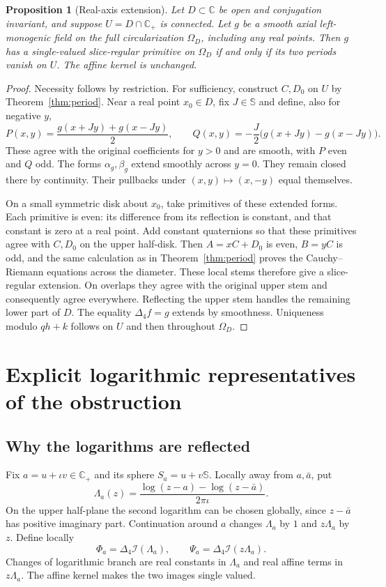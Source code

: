 \documentclass[11pt,a4paper]{article}
\numberwithin{equation}{section}
\newtheorem{proposition}[theorem]{Proposition}
\theoremstyle{definition}
\theoremstyle{remark}
\newcommand{\C}{\mathbb C}
\newcommand{\SSS}{\mathbb S}
\newcommand{\lap}{\Delta_4}
\newcommand{\lift}{\mathcal I}
\begin{document}
\begin{proposition}[Real-axis extension]\label{prop:axis}
Let $D\subset\C$ be open and conjugation invariant, and suppose
$U=D\cap\C_+$ is connected. Let $g$ be a smooth axial left-monogenic
field on the full circularization $\Omega_D$, including any real points.
Then $g$ has a single-valued slice-regular primitive on $\Omega_D$ if and
only if its two periods vanish on $U$. The affine kernel is unchanged.
\end{proposition}
\begin{proof}
Necessity follows by restriction. For sufficiency, construct $C,D_0$ on
$U$ by Theorem~\ref{thm:period}. Near a real point $x_0\in D$, fix
$J\in\SSS$ and define, also for negative $y$,
\[
 P(x,y)=\frac{g(x+Jy)+g(x-Jy)}2,\qquad
 Q(x,y)=-\frac J2\bigl(g(x+Jy)-g(x-Jy)\bigr).
\]
These agree with the original coefficients for $y>0$ and are smooth,
with $P$ even and $Q$ odd. The forms $\alpha_g,\beta_g$ extend smoothly
across $y=0$. They remain closed there by continuity. Their pullbacks
under $(x,y)\mapsto(x,-y)$ equal themselves.

On a small symmetric disk about $x_0$, take primitives of these extended
forms. Each primitive is even: its difference from its reflection is
constant, and that constant is zero at a real point. Add constant
quaternions so that these primitives agree with $C,D_0$ on the upper
half-disk. Then $A=xC+D_0$ is even, $B=yC$ is odd, and the same calculation
as in Theorem~\ref{thm:period} proves the Cauchy--Riemann equations across
the diameter. These local stems therefore give a slice-regular extension.
On overlaps they agree with the original upper stem and consequently
agree everywhere. Reflecting the upper stem handles the remaining lower
part of $D$. The equality $\lap f=g$ extends by smoothness. Uniqueness
modulo $qh+k$ follows on $U$ and then throughout $\Omega_D$.
\end{proof}

\section{Explicit logarithmic representatives of the obstruction}
\label{sec:modes}

\subsection{Why the logarithms are reflected}
Fix $a=u+\iota v\in\C_+$ and its sphere $S_a=u+v\SSS$. Locally away
from $a,\bar a$, put
\begin{equation}\label{eq:Lambda}
 \Lambda_a(z)=\frac{\log(z-a)-\log(z-\bar a)}{2\pi\iota}.
\end{equation}
On the upper half-plane the second logarithm can be chosen globally,
since $z-\bar a$ has positive imaginary part. Continuation around $a$
changes $\Lambda_a$ by $1$ and $z\Lambda_a$ by $z$.
Define locally
\begin{equation}\label{eq:mode-definition}
 \Phi_a=\lap\lift(\Lambda_a),\qquad
 \Psi_a=\lap\lift(z\Lambda_a).
\end{equation}
Changes of logarithmic branch are real constants in $\Lambda_a$ and
real affine terms in $z\Lambda_a$. The affine kernel makes the two
images single valued.
\end{document}
